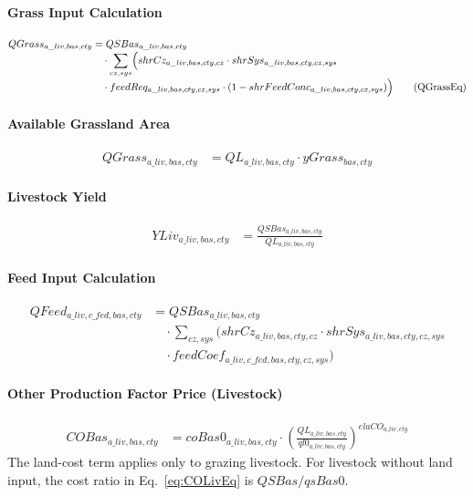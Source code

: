 \paragraph{Grass Input Calculation}
\begin{align}
  QGrass_{a\_liv,bas,cty}
  &=
     QSBas_{a\_liv,bas,cty}
     \nonumber\\[-0.3em]
  &\quad
     \cdot
     \sum_{cz,sys}
     \Bigl(
       shrCz_{a\_liv,bas,cty,cz}
       \cdot
       shrSys_{a\_liv,bas,cty,cz,sys}
       \nonumber\\[-0.3em]
  &\quad
       \cdot
       feedReq_{a\_liv,bas,cty,cz,sys}
       \cdot
       (1 - shrFeedConc_{a\_liv,bas,cty,cz,sys})
     \Bigr)
  \tag{QGrassEq}\label{eq:QGrassEq}
\end{align}

\paragraph{Available Grassland Area}
\begin{align}
  QGrass_{a\_liv,bas,cty}
  &=
     QL_{a\_liv,bas,cty}
     \cdot
     yGrass_{bas,cty}
  \tag{GrassBalEq}\label{eq:GrassBalEq}
\end{align}


\paragraph{Livestock Yield}
\begin{align}
  YLiv_{a\_liv,bas,cty}
  &= \frac{
       QSBas_{a\_liv,bas,cty}
     }{
       QL_{a\_liv,bas,cty}
     }
  \tag{YLivEq}\label{eq:YLivEq}
\end{align}

\paragraph{Feed Input Calculation}
\begin{align}
  QFeed_{a\_liv,c\_fed,bas,cty}
  &= QSBas_{a\_liv,bas,cty}
     \nonumber\\[-0.3em]
  &\quad
     \cdot
     \sum_{cz,sys}
     \bigl(
       shrCz_{a\_liv,bas,cty,cz}
       \cdot shrSys_{a\_liv,bas,cty,cz,sys}
       \nonumber\\[-0.3em]
  &\quad
       \cdot feedCoef_{a\_liv,c\_fed,bas,cty,cz,sys}
     \bigr)
  \tag{QFeedEq}\label{eq:QFeedEq}
\end{align}

\paragraph{Other Production Factor Price (Livestock)}
\begin{align}
  COBas_{a\_liv,bas,cty}
  &= coBas0_{a\_liv,bas,cty}
     \cdot\left(\frac{QL_{a\_liv,bas,cty}}{ql0_{a\_liv,bas,cty}}\right)^{elaCO_{a\_liv,cty}}
  \tag{COLivEq}\label{eq:COLivEq}
\end{align}
The land-cost term applies only to grazing livestock. For livestock without land input, the cost ratio in Eq.~\eqref{eq:COLivEq} is \(QSBas/qsBas0\).

